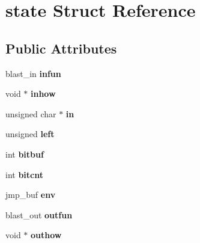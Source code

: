 \hypertarget{structstate}{\section{state Struct Reference}
\label{structstate}
}
\subsection*{Public Attributes}
\begin{DoxyCompactItemize}
\item 
\hypertarget{structstate_a9cefd1a78926f10a353274c995f61e88}{blast\+\_\+in {\bfseries infun}}\label{structstate_a9cefd1a78926f10a353274c995f61e88}

\item 
\hypertarget{structstate_ab917c365dee9282d50b5a47a3ddd9fcd}{void $\ast$ {\bfseries inhow}}\label{structstate_ab917c365dee9282d50b5a47a3ddd9fcd}

\item 
\hypertarget{structstate_aafccd28823b0f3e3a2ddefa99f2fad61}{unsigned char $\ast$ {\bfseries in}}\label{structstate_aafccd28823b0f3e3a2ddefa99f2fad61}

\item 
\hypertarget{structstate_a1ac80f870aaec1964409bcb8c4a87d34}{unsigned {\bfseries left}}\label{structstate_a1ac80f870aaec1964409bcb8c4a87d34}

\item 
\hypertarget{structstate_a582d99a570119648c33ef9c5acf00a0f}{int {\bfseries bitbuf}}\label{structstate_a582d99a570119648c33ef9c5acf00a0f}

\item 
\hypertarget{structstate_ad1c5dbfc0c1c555bd5e30f830868e319}{int {\bfseries bitcnt}}\label{structstate_ad1c5dbfc0c1c555bd5e30f830868e319}

\item 
\hypertarget{structstate_a9a0d5bd9a472fbe06d3d811f5094da3c}{jmp\+\_\+buf {\bfseries env}}\label{structstate_a9a0d5bd9a472fbe06d3d811f5094da3c}

\item 
\hypertarget{structstate_a440d2e2a4582c8392a7b0601b5d6fa7c}{blast\+\_\+out {\bfseries outfun}}\label{structstate_a440d2e2a4582c8392a7b0601b5d6fa7c}

\item 
\hypertarget{structstate_ab3254503fa636e963f6323d95c62d83e}{void $\ast$ {\bfseries outhow}}\label{structstate_ab3254503fa636e963f6323d95c62d83e}


\end{DoxyCompactItemize}
